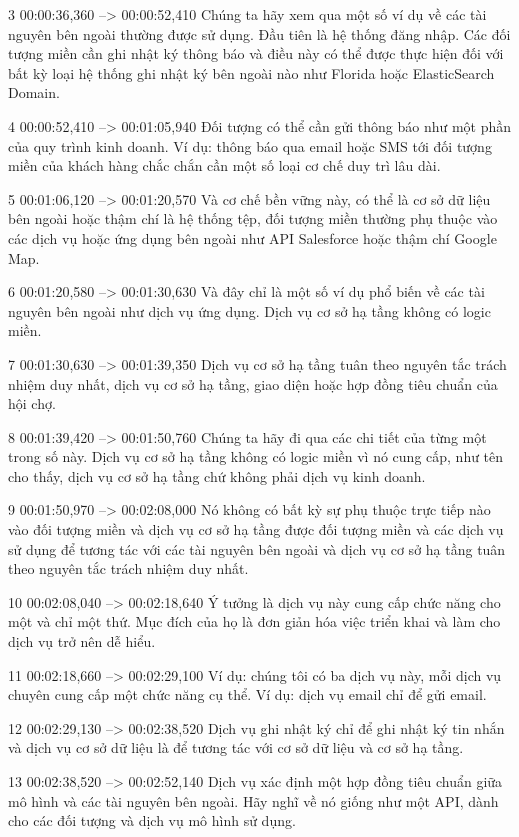 3
00:00:36,360 --> 00:00:52,410
Chúng ta hãy xem qua một số ví dụ về các tài nguyên bên ngoài thường được sử dụng.  Đầu tiên là hệ thống đăng nhập.  Các đối tượng miền cần ghi nhật ký thông báo và điều này có thể được thực hiện đối với bất kỳ loại hệ thống ghi nhật ký bên ngoài nào như Florida hoặc ElasticSearch Domain.

4
00:00:52,410 --> 00:01:05,940
Đối tượng có thể cần gửi thông báo như một phần của quy trình kinh doanh.  Ví dụ: thông báo qua email hoặc SMS tới đối tượng miền của khách hàng chắc chắn cần một số loại cơ chế duy trì lâu dài.

5
00:01:06,120 --> 00:01:20,570
Và cơ chế bền vững này, có thể là cơ sở dữ liệu bên ngoài hoặc thậm chí là hệ thống tệp, đối tượng miền thường phụ thuộc vào các dịch vụ hoặc ứng dụng bên ngoài như API Salesforce hoặc thậm chí Google Map.

6
00:01:20,580 --> 00:01:30,630
Và đây chỉ là một số ví dụ phổ biến về các tài nguyên bên ngoài như dịch vụ ứng dụng.  Dịch vụ cơ sở hạ tầng không có logic miền.

7
00:01:30,630 --> 00:01:39,350
Dịch vụ cơ sở hạ tầng tuân theo nguyên tắc trách nhiệm duy nhất, dịch vụ cơ sở hạ tầng, giao diện hoặc hợp đồng tiêu chuẩn của hội chợ.

8
00:01:39,420 --> 00:01:50,760
Chúng ta hãy đi qua các chi tiết của từng một trong số này.  Dịch vụ cơ sở hạ tầng không có logic miền vì nó cung cấp, như tên cho thấy, dịch vụ cơ sở hạ tầng chứ không phải dịch vụ kinh doanh.

9
00:01:50,970 --> 00:02:08,000
Nó không có bất kỳ sự phụ thuộc trực tiếp nào vào đối tượng miền và dịch vụ cơ sở hạ tầng được đối tượng miền và các dịch vụ sử dụng để tương tác với các tài nguyên bên ngoài và dịch vụ cơ sở hạ tầng tuân theo nguyên tắc trách nhiệm duy nhất.

10
00:02:08,040 --> 00:02:18,640
Ý tưởng là dịch vụ này cung cấp chức năng cho một và chỉ một thứ.  Mục đích của họ là đơn giản hóa việc triển khai và làm cho dịch vụ trở nên dễ hiểu.

11
00:02:18,660 --> 00:02:29,100
Ví dụ: chúng tôi có ba dịch vụ này, mỗi dịch vụ chuyên cung cấp một chức năng cụ thể.  Ví dụ: dịch vụ email chỉ để gửi email.

12
00:02:29,130 --> 00:02:38,520
Dịch vụ ghi nhật ký chỉ để ghi nhật ký tin nhắn và dịch vụ cơ sở dữ liệu là để tương tác với cơ sở dữ liệu và cơ sở hạ tầng.

13
00:02:38,520 --> 00:02:52,140
Dịch vụ xác định một hợp đồng tiêu chuẩn giữa mô hình và các tài nguyên bên ngoài.  Hãy nghĩ về nó giống như một API, dành cho các đối tượng và dịch vụ mô hình sử dụng.

